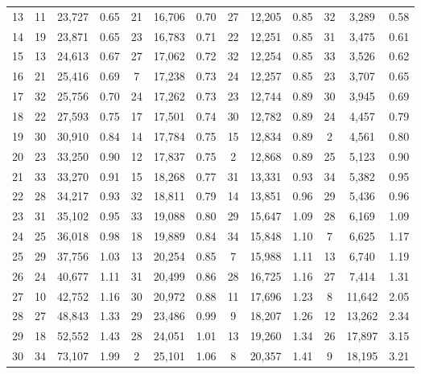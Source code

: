 \begin{table}[H]
{\begin{tabular}{c c c c c c c c c c c c c}
       13 & 11  & 23,727 &  0.65 & 21  & 16,706 &  0.70 & 27  & 12,205 &  0.85 & 32  & 3,289 &  0.58 \\ 
       14 & 19  & 23,871 &  0.65 & 23  & 16,783 &  0.71 & 22  & 12,251 &  0.85 & 31  & 3,475 &  0.61 \\ 
       15 & 13  & 24,613 &  0.67 & 27  & 17,062 &  0.72 & 32  & 12,254 &  0.85 & 33  & 3,526 &  0.62 \\ 
       16 & 21  & 25,416 &  0.69 & 7  & 17,238 &  0.73 & 24  & 12,257 &  0.85 & 23  & 3,707 &  0.65 \\ 
       17 & 32  & 25,756 &  0.70 & 24  & 17,262 &  0.73 & 23  & 12,744 &  0.89 & 30  & 3,945 &  0.69 \\ 
       18 & 22  & 27,593 &  0.75 & 17  & 17,501 &  0.74 & 30  & 12,782 &  0.89 & 24  & 4,457 &  0.79 \\ 
       19 & 30  & 30,910 &  0.84 & 14  & 17,784 &  0.75 & 15  & 12,834 &  0.89 & 2  & 4,561 &  0.80 \\ 
       20 & 23  & 33,250 &  0.90 & 12  & 17,837 &  0.75 & 2  & 12,868 &  0.89 & 25  & 5,123 &  0.90 \\ 
       21 & 33  & 33,270 &  0.91 & 15  & 18,268 &  0.77 & 31  & 13,331 &  0.93 & 34  & 5,382 &  0.95 \\ 
       22 & 28  & 34,217 &  0.93 & 32  & 18,811 &  0.79 & 14  & 13,851 &  0.96 & 29  & 5,436 &  0.96 \\ 
       23 & 31  & 35,102 &  0.95 & 33  & 19,088 &  0.80 & 29  & 15,647 &  1.09 & 28  & 6,169 &  1.09 \\ 
       24 & 25  & 36,018 &  0.98 & 18  & 19,889 &  0.84 & 34  & 15,848 &  1.10 & 7  & 6,625 &  1.17 \\ 
       25 & 29  & 37,756 &  1.03 & 13  & 20,254 &  0.85 & 7  & 15,988 &  1.11 & 13  & 6,740 &  1.19 \\ 
       26 & 24  & 40,677 &  1.11 & 31  & 20,499 &  0.86 & 28  & 16,725 &  1.16 & 27  & 7,414 &  1.31 \\ 
       27 & 10  & 42,752 &  1.16 & 30  & 20,972 &  0.88 & 11  & 17,696 &  1.23 & 8  & 11,642 &  2.05 \\ 
       28 & 27  & 48,843 &  1.33 & 29  & 23,486 &  0.99 & 9  & 18,207 &  1.26 & 12  & 13,262 &  2.34 \\ 
       29 & 18  & 52,552 &  1.43 & 28  & 24,051 &  1.01 & 13  & 19,260 &  1.34 & 26  & 17,897 &  3.15 \\ 
       30 & 34  & 73,107 &  1.99 & 2  & 25,101 &  1.06 & 8  & 20,357 &  1.41 & 9  & 18,195 &  3.21 \\ 

\end{tabular}}
\end{table}
